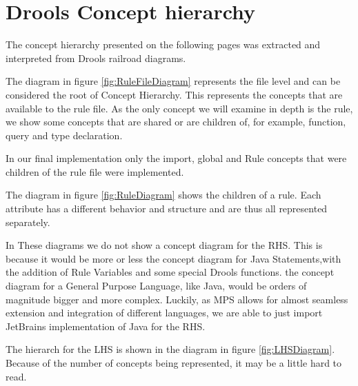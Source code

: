 \chapter{Drools Concept hierarchy}
\label{appendix:DroolsConceptHierarchy}

The concept hierarchy presented on the following pages was extracted and interpreted from Drools railroad diagrams.

The diagram in figure \ref{fig:RuleFileDiagram} represents the file level and can be considered the root of Concept Hierarchy.
This represents the concepts that are available to the rule file.
As the only concept we will examine in depth is the rule, we show some concepts that are shared or are children of, for example, function, query and type declaration.

In our final implementation only the import, global and Rule concepts that were children of the rule file were implemented.

The diagram in figure \ref{fig:RuleDiagram} shows the children of a rule.
Each attribute has a different behavior and structure and are thus all represented separately.

In These diagrams we do not show a concept diagram for the RHS.
This is because it would be more or less the concept diagram for Java Statements,with the addition of Rule Variables and some special Drools functions.
the concept diagram for a General Purpose Language, like Java, would be orders of magnitude bigger and more complex.
Luckily, as MPS allows for almost seamless extension and integration of different languages, we are able to just import JetBrains implementation of Java for the RHS.

The hierarch for the LHS is shown in the diagram in figure \ref{fig:LHSDiagram}.
Because of the number of concepts being represented, it may be a little hard to read.

